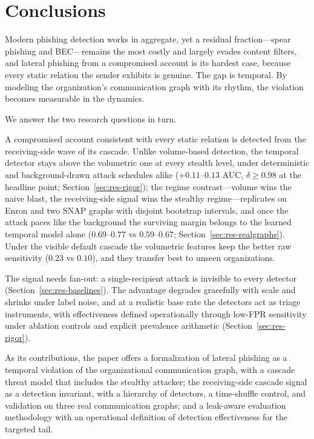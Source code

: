 \section{Conclusions}
\label{sec:conclusion}

Modern phishing detection works in aggregate, yet a residual fraction---spear phishing and BEC---remains the
most costly and largely evades content filters, and lateral phishing from a compromised account is its hardest
case, because every static relation the sender exhibits is genuine. The gap is temporal. By modeling the
organization's communication graph with its rhythm, the violation becomes measurable in the dynamics.

We answer the two research questions in turn.
\begin{description}[noitemsep,topsep=2pt]
  \item[RQ1 (signal, T1):] A compromised account consistent with every static relation is detected from the
  receiving-side wave of its cascade. Unlike volume-based detection, the temporal detector
  stays above the volumetric one at every stealth level, under deterministic and background-drawn attack
  schedules alike ($+0.11$--$0.13$ AUC, $\delta\ge0.98$ at the headline point;
  Section~\ref{sec:res-rigor}); the regime contrast---volume wins the naive blast,
  the receiving-side signal wins the stealthy regime---replicates on Enron and two SNAP graphs with
  disjoint bootstrap intervals, and once the attack paces like the background the surviving margin
  belongs to the learned temporal model alone ($0.69$--$0.77$ vs $0.59$--$0.67$;
  Section~\ref{sec:res-realgraphs}). Under the visible default cascade the volumetric features keep the
  better raw sensitivity ($0.23$ vs $0.10$), and they transfer best to unseen organizations.
  \item[RQ2 (limits, T2):] The signal needs fan-out: a single-recipient attack is invisible to every
  detector (Section~\ref{sec:res-baselines}). The advantage degrades gracefully with scale and shrinks under
  label noise, and at a realistic base rate the detectors act as triage instruments, with effectiveness defined
  operationally through low-FPR sensitivity under ablation controls and explicit prevalence arithmetic
  (Section~\ref{sec:res-rigor}).
\end{description}

As its contributions, the paper offers a formalization of lateral phishing as a temporal violation of the
organizational communication graph, with a cascade threat model that includes the stealthy attacker; the
receiving-side cascade signal as a detection invariant, with a hierarchy of detectors, a time-shuffle control, and
validation on three real communication graphs; and a leak-aware evaluation methodology with an operational
definition of detection effectiveness for the targeted tail.

